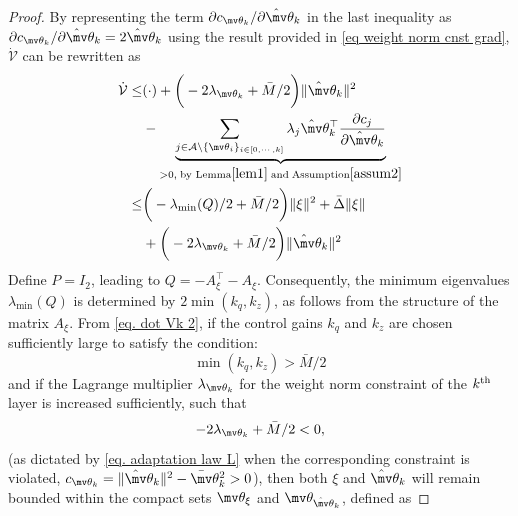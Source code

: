 \documentclass[lettersize,journal]{IEEEtran}
\newcommand*{\wth}{\mv\theta}
\begin{document}
\begin{proof}
By representing the term $\partial c_{\wth_k}/\partial \hat\wth_k$ in the last inequality as $\partial c_{\wth_k}/\partial \hat\wth_k=2\hat\wth_k$ using the result provided in \eqref{eq weight norm cnst grad}, $\dot {\mathcal V}$ can be rewritten as
\begin{equation}
    \begin{aligned}
        \dot {\mathcal V} \le&
        (\cdot) + 
        \bigg(
            -2\lambda _{\wth_k}+{\bar M}/{2}
        \bigg)
        \Vert\hat\wth_k\Vert^2 
        \\
        &- \underbrace{
        \sum_{j\in\mathcal{A}\setminus \{\wth_i\}_{i\in[0,\cdots,k]}}\lambda_j\hat\wth_k^\top{\partial c_j\over\partial \hat\wth_k}
        }_{>0, \text{\;by Lemma} \ref{lem1} \text{\;and\;} \text{Assumption} \ref{assum2}}	
        \\
        \le&
        \bigg(
            -{\lambda_\text{min}(Q)}/{2}+{\bar M}/{2}
        \bigg)
        \Vert\xi\Vert^2
        +\bar \Delta \Vert \xi\Vert 
        \\&
        + 
        \bigg(
            -2\lambda _{\wth_k}+{\bar M}/{2}
        \bigg)
        \Vert\hat\wth_k\Vert^2 
    \end{aligned}
    \label{eq. dot Vk 2}
\end{equation}
Define $P=I_2$, leading to $Q = -A_{\xi}^\top - A_{\xi}$. Consequently, the minimum eigenvalues ${\lambda_{\text{min}}(Q)}$ is determined by $2\min({k_q},{k_z})$, as follows from the structure of the matrix $A_{\xi}$. From \eqref{eq. dot Vk 2}, if the control gains ${k_q}$ and ${k_z}$ are chosen sufficiently large to satisfy the condition:
\begin{equation}
    \min({k_q},{k_z})>\bar M/2
    \label{eq. ctrl stable condition}
\end{equation}
and if the Lagrange multiplier $\lambda_{\wth_k}$ for the weight norm constraint of the $k\textsuperscript{th}$ layer is increased sufficiently, such that
\begin{equation}\label{eq: lambda bk}
    -2\lambda_{\wth_k} +{\bar M/ 2}<0,  
\end{equation}
(as dictated by \eqref{eq. adaptation law L} when the corresponding constraint is violated, \ie $c_{\wth_k}=\Vert \hat\wth_k\Vert^2 -\bar\wth_k^2 > 0$), then both $\xi$ and $\hat\wth_k$ will remain bounded within the compact sets $\wth_\xi$ and $\wth_{\hat\wth_k}$, defined as

\end{proof}
\end{document}
